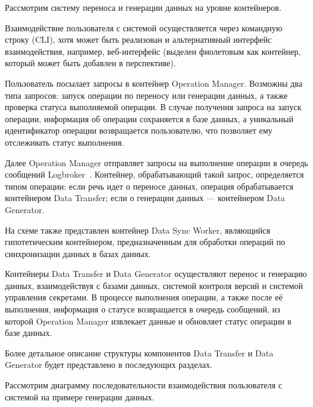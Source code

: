 Рассмотрим систему переноса и генерации данных на уровне контейнеров.

Взаимодействие пользователя с системой осуществляется через командную строку (CLI), хотя может быть реализован и альтернативный интерфейс взаимодействия, например, веб-интерфейс (выделен фиолетовым как контейнер, который может быть добавлен в перспективе).

Пользователь посылает запросы в контейнер Operation Manager. Возможны два типа запросов: запуск операции по переносу или генерации данных, а также проверка статуса выполняемой операции. В случае получения запроса на запуск операции, информация об операции сохраняется в базе данных, а уникальный идентификатор операции возвращается пользователю, что позволяет ему отслеживать статус выполнения.

Далее Operation Manager отправляет запросы на выполнение операции в очередь сообщений Logbroker~\cite{logbroker}. Контейнер, обрабатывающий такой запрос, определяется типом операции: если речь идет о переносе данных, операция обрабатывается контейнером Data Transfer; если о генерации данных — контейнером Data Generator.

На схеме также представлен контейнер Data Sync Worker, являющийся гипотетическим контейнером, предназначенным для обработки операций по синхронизации данных в базах данных.

Контейнеры Data Transfer и Data Generator осуществляют перенос и генерацию данных, взаимодействуя с базами данных, системой контроля версий и системой управления секретами. В процессе выполнения операции, а также после её выполнения, информация о статусе возвращается в очередь сообщений, из которой Operation Manager извлекает данные и обновляет статус операции в базе данных.

Более детальное описание структуры компонентов Data Transfer и Data Generator будет представлено в последующих разделах.

Рассмотрим диаграмму последовательности взаимодействия пользователя с системой на примере генерации данных.

